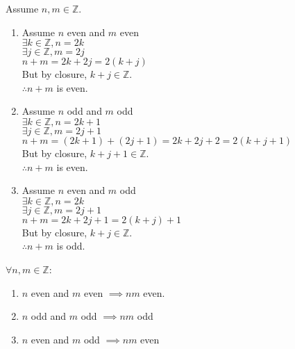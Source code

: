 \documentclass[letterpaper,12pt,fleqn]{article}
\begin{document}
\begin{theproof}
Assume $n,m\in\mathbb{Z}$.
\begin{enumerate}
\item{Assume $n$ even and $m$ even \\}
$\exists k\in\mathbb{Z},n=2k$ \\
$\exists j\in\mathbb{Z},m=2j$ \\
$n+m=2k+2j=2(k+j)$ \\
But by closure, $k+j\in\mathbb{Z}$. \\
$\therefore n+m$ is even.

\item {Assume $n$ odd and $m$ odd \\}
$\exists k\in\mathbb{Z},n=2k+1$ \\
$\exists j\in\mathbb{Z},m=2j+1$ \\
$n+m=(2k+1)+(2j+1)=2k+2j+2=2(k+j+1)$ \\
But by closure, $k+j+1\in\mathbb{Z}$. \\
$\therefore n+m$ is even.

\item {Assume $n$ even and $m$ odd \\}
$\exists k\in\mathbb{Z},n=2k$ \\
$\exists j\in\mathbb{Z},m=2j+1$ \\
$n+m=2k+2j+1=2(k+j)+1$ \\
But by closure, $k+j\in\mathbb{Z}$. \\
$\therefore n+m$ is odd.
\end{enumerate}
\end{theproof}

\begin{theorem}
$\forall n,m\in\mathbb{Z}$:
\begin{enumerate}
\item{$n$ even and $m$ even $\implies nm$ even.}
\item{$n$ odd and $m$ odd $\implies nm$ odd}
\item{$n$ even and $m$ odd $\implies nm$ even}
\end{enumerate}
\end{theorem}
\end{document}

